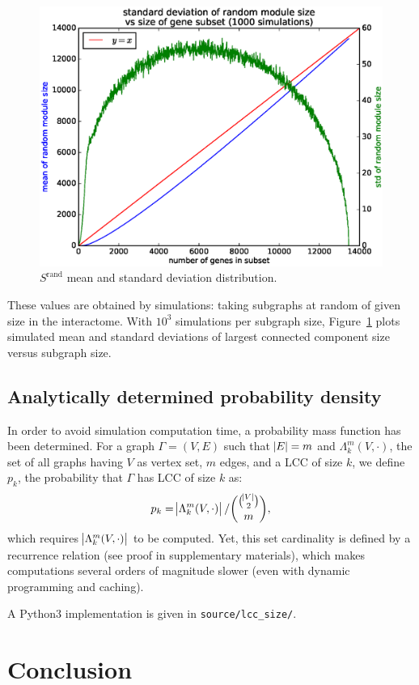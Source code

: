 \documentclass[letterpaper]{article}
\begin{document}
	\begin{figure}[!h]\centering
		\includegraphics[width=.45\textwidth]{images/Srand_distribution_1000_sims.eps}
		\caption{$S^{\text{rand}}$ mean and standard deviation distribution.\label{fig:Srand distribution}}
	\end{figure}

	These values are obtained by simulations: taking subgraphs at random of given size in the
	interactome. With $10^3$ simulations per subgraph size, Figure~\ref{fig:Srand distribution}
	plots simulated mean and standard deviations of largest connected component size versus
	subgraph size.

	\subsection{Analytically determined probability density}
	In order to avoid simulation computation time, a probability mass function has been determined. For a graph $\Gamma = (V, E)$
	such that $\abs E = m$ and $\Lambda_k^m(V, \cdot)$, the set of all graphs having $V$ as vertex set, $m$ edges, and a LCC of size $k$,
	we define $p_k$, the probability that $\Gamma$ has LCC of size $k$ as:
	\begin{equation}
		p_k = \abs {\Lambda_k^m(V, \cdot)}/\binom {\binom {\abs V}2}m,
	\end{equation}
	which requires $\abs {\Lambda_k^m(V, \cdot)}$ to be computed. Yet, this set cardinality is defined by a recurrence relation
	(see proof in supplementary materials), which makes computations several orders of magnitude slower (even with dynamic programming
	and caching).

	A Python3 implementation is given in \texttt{source/lcc\_size/}.

\section{Conclusion}

\footnotesize

{}
\end{document}
